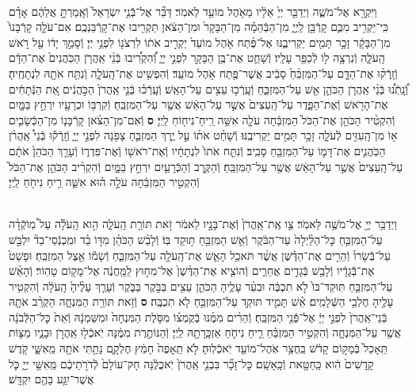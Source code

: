 \documentclass[twoside, openany, parskip=half, 11pt]{book}
\begin{document}
\begin{sometimes}
\begin{footnotesize}
\begin{multicols}{2}
\\
וַיִּקְרָ֖א אֶל־מֹשֶׁ֑ה וַיְדַבֵּ֤ר יְיָ֙ אֵלָ֔יו מֵאֹ֥הֶל מוֹעֵ֖ד לֵאמֹֽר׃ דַּבֵּ֞ר אֶל־בְּֿֿנֵ֤י יִשְׂרָאֵל֙ וְֿאָֽמַרְתָּ֣ אֲלֵהֶ֔ם אָדָ֗ם כִּֽי־יַקְרִ֥יב מִכֶּ֛ם קָרְֿבָּ֖ן לַֽיְיָ֑ מִן־הַבְּֿהֵמָ֗ה מִן־הַבָּקָר֙ וּמִן־הַצֹּ֔אן תַּקְרִ֖יבוּ אֶת־קָרְֿבַּנְכֶֽם׃ אִם־עֹלָ֤ה קָרְֿבָּנוֹ֙ מִן־הַבָּקָ֔ר זָכָ֥ר תָּמִ֖ים יַקְרִיבֶ֑נּוּ אֶל־פֶּ֜תַח אֹ֤הֶל מוֹעֵד֙ יַקְרִ֣יב אֹת֔וֹ לִרְצֹנ֖וֹ לִפְנֵ֥י יְיָ׃
וְֿסָמַ֣ךְ יָד֔וֹ עַ֖ל רֹ֣אשׁ הָֽעֹלָ֑ה וְֿנִרְצָ֥ה ל֖וֹ לְֿכַפֵּ֥ר עָלָֽיו׃
וְֿשָׁחַ֛ט אֶת־בֶּ֥ן הַבָּקָ֖ר לִפְנֵ֣י יְיָ֑ וְֿ֠הִקְרִ֠יבוּ בְּֿנֵ֨י אַֽהֲרֹ֤ן הַכֹּֽהֲנִים֙ אֶת־הַדָּ֔ם וְֿזָֽרְֿק֨וּ אֶת־הַדָּ֤ם עַל־הַמִּזְבֵּ֨חַ֙ סָבִ֔יב אֲשֶׁר־פֶּ֖תַח אֹ֥הֶל מוֹעֵֽד׃ וְֿהִפְשִׁ֖יט אֶת־הָֽעֹלָ֑ה וְֿנִתַּ֥ח אֹתָ֖הּ לִנְתָחֶֽיהָ׃ וְֿ֠נָֽתְֿנ֠וּ בְּֿנֵ֨י אַֽהֲרֹ֧ן הַכֹּהֵ֛ן אֵ֖שׁ עַל־הַמִּזְבֵּ֑חַ וְֿעָֽרְֿכ֥וּ עֵצִ֖ים עַל־הָאֵֽשׁ׃ וְֿעָֽרְֿכ֗וּ בְּֿנֵ֤י אַֽהֲרֹן֙ הַכֹּ֣הֲנִ֔ים אֵ֚ת הַנְּֿתָחִ֔ים אֶת־הָרֹ֖אשׁ וְֿאֶת־הַפָּ֑דֶר עַל־הָֽעֵצִים֙ אֲשֶׁ֣ר עַל־הָאֵ֔שׁ אֲשֶׁ֖ר עַל־הַמִּזְבֵּֽחַ׃ וְֿקִרְבּ֥וֹ וּכְרָעָ֖יו יִרְחַ֣ץ בַּמָּ֑יִם וְֿהִקְטִ֨יר הַכֹּהֵ֤ן אֶת־הַכֹּל֙ הַמִּזְבֵּ֔חָה עֹלָ֛ה אִשֵּׁ֥ה רֵֽיחַ־נִיח֖וֹחַ לַֽיְיָ׃ \textbf{ס}  וְֿאִם־מִן־הַצֹּ֨אן קָרְֿבָּנ֧וֹ מִן־הַכְּֿשָׂבִ֛ים א֥וֹ מִן־הָֽעִזִּ֖ים לְֿעֹלָ֑ה זָכָ֥ר תָּמִ֖ים יַקְרִיבֶֽנּוּ׃ וְֿשָׁחַ֨ט אֹת֜וֹ עַ֣ל יֶ֧רֶךְ הַמִּזְבֵּ֛חַ צָפֹ֖נָה לִפְנֵ֣י יְיָ֑ וְֿזָֽרְֿק֡וּ בְּֿנֵי֩ אַֽהֲרֹ֨ן הַכֹּֽהֲנִ֧ים אֶת־דָּמ֛וֹ עַל־הַמִּזְבֵּ֖חַ סָבִֽיב׃ וְֿנִתַּ֤ח אֹתוֹ֙ לִנְתָחָ֔יו וְֿאֶת־רֹאשׁ֖וֹ וְֿאֶת־פִּדְר֑וֹ וְֿעָרַ֤ךְ הַכֹּהֵן֙ אֹתָ֔ם עַל־הָֽעֵצִים֙ אֲשֶׁ֣ר עַל־הָאֵ֔שׁ אֲשֶׁ֖ר עַל־הַמִּזְבֵּֽחַ׃ וְֿהַקֶּ֥רֶב וְֿהַכְּֿרָעַ֖יִם יִרְחַ֣ץ בַּמָּ֑יִם וְֿהִקְרִ֨יב הַכֹּהֵ֤ן אֶת־הַכֹּל֙ וְֿהִקְטִ֣יר הַמִּזְבֵּ֔חָה עֹלָ֣ה ה֗וּא אִשֵּׁ֛ה רֵ֥יחַ נִיחֹ֖חַ לַֽיְיָ׃

\\
וַיְדַבֵּ֥ר יְיָ֖ אֶל־מֹשֶׁ֥ה לֵּאמֹֽר׃ צַ֤ו אֶֽת־אַֽהֲרֹן֙ וְֿאֶת־בָּנָ֣יו לֵאמֹ֔ר זֹ֥את תּוֹרַ֖ת הָֽעֹלָ֑ה הִ֣וא הָֽעֹלָ֡ה עַל֩ מֽוֹקְֿדָ֨ה עַל־הַמִּזְבֵּ֤חַ כׇּל־הַלַּ֨יְלָה֙ עַד־הַבֹּ֔קֶר וְֿאֵ֥שׁ הַמִּזְבֵּ֖חַ תּ֥וּקַד בּֽוֹ׃ וְֿלָבַ֨שׁ הַכֹּהֵ֜ן מִדּ֣וֹ בַ֗ד וּמִֽכְנְֿסֵי־בַד֘ יִלְבַּ֣שׁ עַל־בְּֿֿשָׂרוֹ֒ וְֿהֵרִ֣ים אֶת־הַדֶּ֗שֶׁן אֲשֶׁ֨ר תֹּאכַ֥ל הָאֵ֛שׁ אֶת־הָֽעֹלָ֖ה עַל־הַמִּזְבֵּ֑חַ וְֿשָׂמ֕וֹ אֵ֖צֶל הַמִּזְבֵּֽחַ׃  וּפָשַׁט֙ אֶת־בְּֿֿגָדָ֔יו וְֿלָבַ֖שׁ בְּֿגָדִ֣ים אֲחֵרִ֑ים וְֿהוֹצִ֤יא אֶת־הַדֶּ֨שֶׁן֙ אֶל־מִח֣וּץ לַֽמַּֽחֲנֶ֔ה אֶל־מָק֖וֹם טָהֽוֹר׃ וְֿהָאֵ֨שׁ עַל־הַמִּזְבֵּ֤חַ תּֽוּקַד־בּוֹ֙ לֹ֣א תִכְבֶּ֔ה וּבִעֵ֨ר עָלֶ֧יהָ הַכֹּהֵ֛ן עֵצִ֖ים בַּבֹּ֣קֶר בַּבֹּ֑קֶר וְֿעָרַ֤ךְ עָלֶ֨יהָ֙ הָֽעֹלָ֔ה וְֿהִקְטִ֥יר עָלֶ֖יהָ חֶלְבֵ֥י הַשְּֿׁלָמִֽים׃ אֵ֗שׁ תָּמִ֛יד תּוּקַ֥ד עַל־הַמִּזְבֵּ֖חַ לֹ֥א תִכְבֶּֽה׃ \textbf{ס}  וְֿזֹ֥את תּוֹרַ֖ת הַמִּנְחָ֑ה הַקְרֵ֨ב אֹתָ֤הּ בְּֿנֵי־אַֽהֲרֹן֙ לִפְנֵ֣י יְיָ֔ אֶל־פְּֿֿנֵ֖י הַמִּזְבֵּֽחַ׃ וְֿהֵרִ֨ים מִמֶּ֜נּוּ בְּֿקֻמְצ֗וֹ מִסֹּ֤לֶת הַמִּנְחָה֙ וּמִשַּׁמְנָ֔הּ וְֿאֵת֙ כׇּל־הַלְּֿבֹנָ֔ה אֲשֶׁ֖ר עַל־הַמִּנְחָ֑ה וְֿהִקְטִ֣יר הַמִּזְבֵּ֗חַ רֵ֧יחַ נִיחֹ֛חַ אַזְכָּֽרָתָ֖הּ לַֽיְיָ׃ וְֿהַנּוֹתֶ֣רֶת מִמֶּ֔נָּה יֹֽאכְֿל֖וּ אַֽהֲרֹ֣ן וּבָנָ֑יו מַצּ֤וֹת תֵּֽאָכֵל֙ בְּֿמָק֣וֹם קָדֹ֔שׁ בַּֽחֲצַ֥ר אֹֽהֶל־מוֹעֵ֖ד יֹֽאכְֿלֽוּהָ׃ לֹ֤א תֵֽאָפֶה֙ חָמֵ֔ץ חֶלְקָ֛ם נָתַ֥תִּי אֹתָ֖הּ מֵֽאִשָּׁ֑י קֹ֤דֶשׁ קָֽדָשִׁים֙ הִ֔וא כַּֽחַטָּ֖את וְֿכָֽאָשָֽׁם׃ כׇּל־זָכָ֞ר בִּבְנֵ֤י אַֽהֲרֹן֙ יֹֽאכֲלֶ֔נָּה חָק־עוֹלָם֙ לְֿדֹרֹ֣תֵיכֶ֔ם מֵֽאִשֵּׁ֖י יְיָ֑ כֹּ֛ל אֲשֶׁר־יִגַּ֥ע בָּהֶ֖ם יִקְדָּֽשׁ׃


\end{multicols}
\end{footnotesize}
\end{sometimes}
\end{document}
